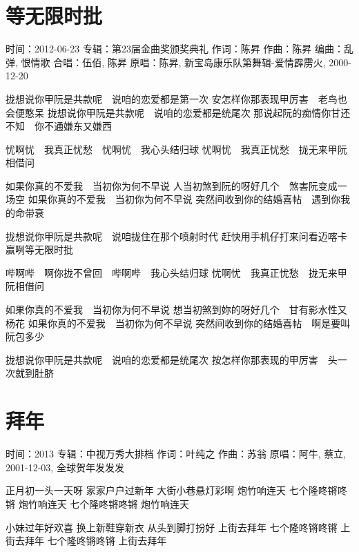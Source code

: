 \documentclass[UTF8,a4paper,oneside,twocolumn,12pt]{ctexbook}
\newcommand{\infopair}[2]{\textbullet #1：#2}
\newcommand{\zc}[1][伍佰]{\infopair{作词}{#1}}
\newcommand{\zq}[1][伍佰]{\infopair{作曲}{#1}}
\newcommand{\bq}[1][伍佰]{\infopair{编曲}{#1}}
\newcommand{\zj}[1]{\infopair{专辑}{#1}}
\newcommand{\yc}[1]{\infopair{原唱}{#1}}
\newcommand{\sj}[1]{\infopair{时间}{#1}}
\newenvironment{info}{\begin{flushleft}\kaishu
	}
	{\end{flushleft}\normalsize\yahei\par}
\newenvironment{lyric}{
	}
{}
\begin{document}
\section{等无限时批}
\begin{info}
	\sj{2012-06-23}
	\zj{第23届金曲奖颁奖典礼}
	\zc[陈昇]
	\zq[陈昇]
	\bq[乱弹, 恨情歌]
	\infopair{合唱}{伍佰, 陈昇}
	\yc{陈昇, 新宝岛康乐队第舞辑-爱情霹雳火, 2000-12-20}
\end{info}
\begin{lyric}
	拢想说你甲阮是共款呢　说咱的恋爱都是第一次
	安怎样你那表现甲厉害　老鸟也会便憨呆
	拢想说你甲阮是共款呢　说咱的恋爱都是统尾次
	那说起阮的痴情你甘还不知　你不通嫌东又嫌西

	忧啊忧　我真正忧愁　忧啊忧　我心头结归球
	忧啊忧　我真正忧愁　拢无来甲阮相借问

	如果你真的不爱我　当初你为何不早说
	人当初煞到阮的呀好几个　煞害阮变成一场空
	如果你真的不爱我　当初你为何不早说
	突然间收到你的结婚喜帖　遇到你我的命带衰

	拢想说你甲阮是共款呢　说咱拢住在那个喷射时代
	赶快用手机仔打来问看迈喀卡赢咧等无限时批

	哔啊哔　啊你拢不曾回　哔啊哔　我心头结归球
	忧啊忧　我真正忧愁　拢无来甲阮相借问

	如果你真的不爱我　当初你为何不早说
	想当初煞到妳的呀好几个　甘有影水性又杨花
	如果你真的不爱我　当初你为何不早说
	突然间收到你的结婚喜帖　啊是要叫阮包多少

	拢想说你甲阮是共款呢　说咱的恋爱都是统尾次
	按怎样你那表现的甲厉害　头一次就到肚脐
\end{lyric}

\section{拜年}%
\begin{info}
	\sj{2013}
	\zj{中视万秀大排档}
	\zc[叶纯之]
	\zq[苏翁]
	\yc{阿牛, 蔡立, 2001-12-03, 全球贺年发发发}
\end{info}
\begin{lyric}
	正月初一头一天呀 家家户户过新年
	大街小巷悬灯彩啊 炮竹响连天
	七个隆咚锵咚锵 炮竹响连天
	七个隆咚锵咚锵 炮竹响连天

	小妹过年好欢喜 换上新鞋穿新衣
	从头到脚打扮好 上街去拜年
	七个隆咚锵咚锵 上街去拜年
	七个隆咚锵咚锵 上街去拜年
\end{lyric}
\end{document}
